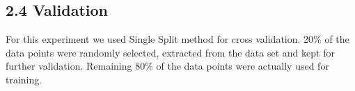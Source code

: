 \subsection*{2.4 Validation}
For this experiment we used Single Split method for cross validation. 20\% of the data points were randomly selected, extracted from the data set and kept for further validation. Remaining 80\% of the data points were actually used for training.